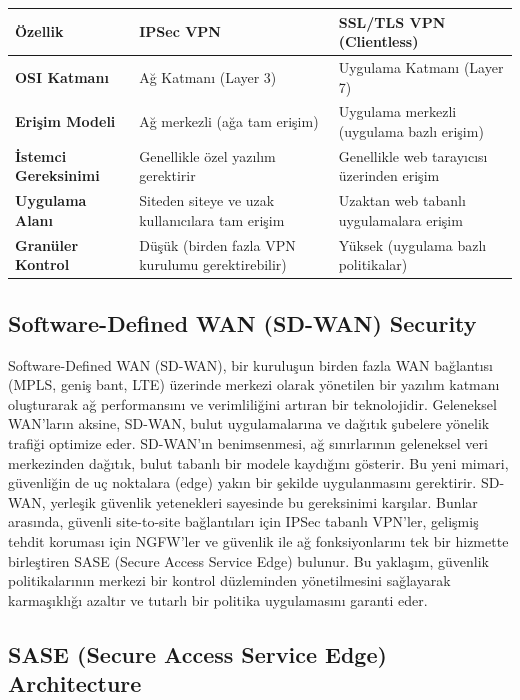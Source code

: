 \begin{adjustbox}{max width=\textwidth}
\begin{tabularx}{\textwidth}{|l|X|X|}
\hline
\textbf{Özellik} & \textbf{IPSec VPN} & \textbf{SSL/TLS VPN (Clientless)} \\
\hline
\textbf{OSI Katmanı} & Ağ Katmanı (Layer 3) & Uygulama Katmanı (Layer 7) \\
\hline
\textbf{Erişim Modeli} & Ağ merkezli (ağa tam erişim) & Uygulama merkezli (uygulama bazlı erişim) \\
\hline
\textbf{İstemci Gereksinimi} & Genellikle özel yazılım gerektirir & Genellikle web tarayıcısı üzerinden erişim \\
\hline
\textbf{Uygulama Alanı} & Siteden siteye ve uzak kullanıcılara tam erişim & Uzaktan web tabanlı uygulamalara erişim \\
\hline
\textbf{Granüler Kontrol} & Düşük (birden fazla VPN kurulumu gerektirebilir) & Yüksek (uygulama bazlı politikalar) \\
\hline
\end{tabularx}
\end{adjustbox}



\subsection{Software-Defined WAN (SD-WAN) Security}

Software-Defined WAN (SD-WAN), bir kuruluşun birden fazla WAN bağlantısı (MPLS, geniş bant, LTE) üzerinde merkezi olarak yönetilen bir yazılım katmanı oluşturarak ağ performansını ve verimliliğini artıran bir teknolojidir. Geleneksel WAN'ların aksine, SD-WAN, bulut uygulamalarına ve dağıtık şubelere yönelik trafiği optimize eder.
SD-WAN'ın benimsenmesi, ağ sınırlarının geleneksel veri merkezinden dağıtık, bulut tabanlı bir modele kaydığını gösterir. Bu yeni mimari, güvenliğin de uç noktalara (edge) yakın bir şekilde uygulanmasını gerektirir. SD-WAN, yerleşik güvenlik yetenekleri sayesinde bu gereksinimi karşılar. Bunlar arasında, güvenli site-to-site bağlantıları için IPSec tabanlı VPN'ler, gelişmiş tehdit koruması için NGFW'ler ve güvenlik ile ağ fonksiyonlarını tek bir hizmette birleştiren SASE (Secure Access Service Edge) bulunur.
Bu yaklaşım, güvenlik politikalarının merkezi bir kontrol düzleminden yönetilmesini sağlayarak karmaşıklığı azaltır ve tutarlı bir politika uygulamasını garanti eder.

\subsection{SASE (Secure Access Service Edge) Architecture}

